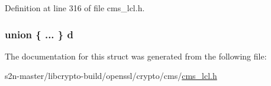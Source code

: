 Definition at line 316 of file cms\+\_\+lcl.\+h.

\subsubsection[{\texorpdfstring{d}{d}}]{\setlength{\rightskip}{0pt plus 5cm}union \{ ... \}   d}\hypertarget{struct_c_m_s___revocation_info_choice__st_ac6a0c178d856eb2089186f1b77d26c72}{}\label{struct_c_m_s___revocation_info_choice__st_ac6a0c178d856eb2089186f1b77d26c72}


The documentation for this struct was generated from the following file\+:\begin{DoxyCompactItemize}
\item 
s2n-\/master/libcrypto-\/build/openssl/crypto/cms/\hyperlink{cms__lcl_8h}{cms\+\_\+lcl.\+h}\end{DoxyCompactItemize}

